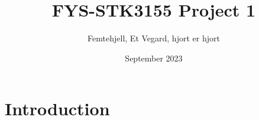 \documentclass{article}
\title{FYS-STK3155 Project 1}
\author{Femtehjell, Et Vegard, hjort er hjort}
\date{September 2023}
\begin{document}
\maketitle

\section{Introduction}
\end{document}

